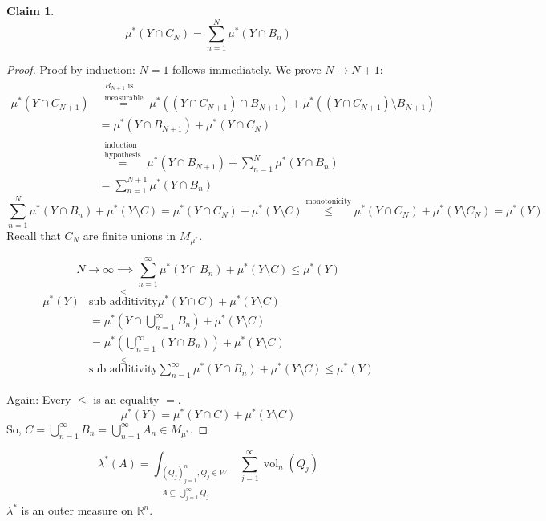 \documentclass{article}
\newtheorem*{claim}{Claim}%
\begin{document}
\begin{claim}
  \[ \mu^*(Y \cap C_N) = \sum_{n=1}^N \mu^*(Y \cap B_n) \]
\end{claim}
\begin{proof}
  Proof by induction:
  $N=1$ follows immediately. We prove $N \to N+1$:
  \begin{align*}
    \mu^*(Y \cap C_{N+1})
      &\stackrel{\substack{B_{N+1} \text{ is } \\ \text{measurable}}}{=} \mu^*((Y \cap C_{N+1}) \cap B_{N+1}) + \mu^*((Y \cap C_{N+1}) \setminus B_{N+1}) \\
      &= \mu^*(Y \cap B_{N+1}) + \mu^*(Y \cap C_N) \\
      &\stackrel{\substack{\text{induction} \\ \text{hypothesis}}}{=} \mu^*(Y \cap B_{N+1}) + \sum_{n=1}^N \mu^*(Y \cap B_n) \\
      &= \sum_{n=1}^{N+1} \mu^*(Y \cap B_n)
  \end{align*}
  \[ \sum_{n=1}^N \mu^*(Y \cap B_n) + \mu^*(Y \setminus C) = \mu^*(Y \cap C_N) + \mu^*(Y \setminus C) \stackrel{\text{monotonicity}}{\leq} \mu^*(Y \cap C_N) + \mu^*(Y \setminus C_N) = \mu^*(Y) \]
  Recall that $C_N$ are finite unions in $M_{\mu^*}$.

  \[ N \to \infty \implies \sum_{n=1}^\infty \mu^*(Y \cap B_n) + \mu^*(Y \setminus C) \leq \mu^*(Y) \]
  \begin{align*}
    \mu^*(Y) &\stackrel{\leq}{\text{sub additivity}} \mu^*(Y \cap C) + \mu^*(Y \setminus C) \\
      &= \mu^*(Y \cap \bigcup_{n=1}^\infty B_n) + \mu^*(Y \setminus C) \\
      &= \mu^*(\bigcup_{n=1}^\infty(Y \cap B_n)) + \mu^*(Y \setminus C) \\
      &\stackrel{\leq}{\text{sub additivity}} \sum_{n=1}^\infty \mu^*(Y \cap B_n) + \mu^*(Y \setminus C) \leq \mu^*(Y)
  \end{align*}

  Again: Every $\leq$ is an equality $=$.
  \[ \mu^*(Y) = \mu^*(Y \cap C) + \mu^*(Y \setminus C) \]
  So, $C = \bigcup_{n=1}^\infty B_n = \bigcup_{n=1}^\infty A_n \in M_{\mu^*}$.
\end{proof}

\[ \lambda^*(A) = \int_{\substack{(Q_j)^n_{j=1}, Q_j \in W \\ A \subseteq \bigcup_{j=1}^\infty Q_j}} \sum_{j=1}^\infty \operatorname{vol}_n(Q_j) \]
$\lambda^*$ is an outer measure on $\mathbb R^n$.
\end{document}
